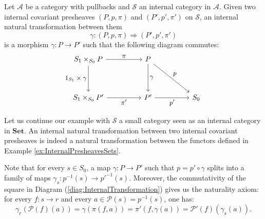 \begin{definition}
\label{def:InternalNaturalTransformation}
    Let $\mathcal{A}$ be a category with pullbacks and $\mathcal{S}$ an internal category in $\mathcal{A}$. Given two internal covariant presheaves $(P,p,\pi)$ and $(P',p',\pi')$ on $\mathcal{S}$, an internal natural transformation between them
    \[ \gamma:(P,p,\pi)\Rightarrow(P',p',\pi') \]
    is a morphism $\gamma:P\longrightarrow P'$ such that the following diagram commutes:
    \begin{equation}
    \label{diag:InternalTransformation}
        \begin{tikzcd}[every label/.append style = {font = \small}]
            S_1\times_{S_0}P \arrow[rr, "\pi"] \arrow[dd, "1_{S_1}\times \gamma"'] & & P \arrow[rrdd, "p"] \arrow[dd, "\gamma"] \\ \\ S_1\times_{S_0}P' \arrow[rr, "\pi'"'] & & P' \arrow[rr, "p'"'] & & S_0
        \end{tikzcd}
    \end{equation}
\end{definition}

\begin{example}
    Let us continue our example with $\mathcal{S}$ a small category seen as an internal category in $\textbf{Set}$. An internal natural transformation between two internal covariant presheaves is indeed a natural transformation between the functors defined in Example \ref{ex:InternalPresheavesSets}.

    Note that for every $s\in S_0$, a map $\gamma:P\longrightarrow P'$ such that $p = p'\circ\gamma$ splits into a family of maps $\gamma_s:p^{-1}(s)\longrightarrow p'^{-1}(s)$. Moreover, the commutativity of the square in Diagram (\ref{diag:InternalTransformation}) gives us the naturality axiom: for every $f:s\to r$ and every $a\in \mathcal{P}(s)=p^{-1}(s)$, one has:
    \[ \gamma_r(\mathcal{P}(f)(a)) = \gamma(\pi(f,a)) = \pi'(f,\gamma(a)) = \mathcal{P}'(f)(\gamma_s(a)). \]
\end{example}

